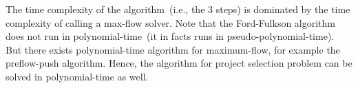 The time complexity of the algorithm~(i.e., the 3 steps) is dominated by the time complexity
of calling a max-flow solver. Note that the Ford-Fulkson algorithm does not run in polynomial-time~(it in facts
runs in pseudo-polynomial-time). But there exists polynomial-time algorithm for maximum-flow, for example
the preflow-push algorithm. Hence, the algorithm for project selection problem can be solved in polynomial-time as well.
